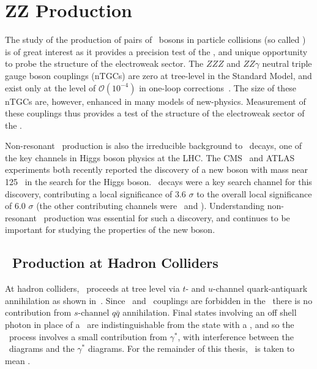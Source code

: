 \graphicspath{{Chapters/TheoryZZProduction/Figures/}}
\chapter{ZZ Production}
\label{chap:TheoryZZProduction}


The study of the production of pairs of \Z\ bosons in particle collisions (so
called ) is of great interest as it provides a
precision test of the \sm, and unique opportunity to probe the structure of the
electroweak sector.  The $ZZZ$ and $ZZ\gamma$ neutral triple gauge boson
couplings (nTGCs) are zero at tree-level in the Standard Model, and exist only
at the level of  $\mathcal{O}(10^{-4})$ in one-loop
corrections~\cite{Gounaris:2000dn}. The size of these nTGCs are, however,
enhanced in many models of new-physics. Measurement of these couplings thus
provides a test of the structure of the electroweak sector of the \sm.

Non-resonant \ZZ\ production is also the irreducible background to \HZZ\ decays,
one of the key channels in Higgs boson physics at the LHC. The
CMS~\cite{CMS_Higgs:2012gu} and ATLAS~\cite{ATLAS_Higgs:2012gk} experiments both
recently reported the discovery of a new boson with mass near 125 \gev\ in the
search for the Higgs boson. \HZZ\ decays were a key search channel for this
discovery, contributing a local significance of 3.6 $\sigma$ to the overall
local significance of 6.0 $\sigma$ (the other contributing channels were \Hgg\
and \HWW). Understanding non-resonant \ZZ\ production was essential for such a
discovery, and continues to be important for studying the properties of the new
boson.

\section{\ZZ\ Production at Hadron Colliders}

At hadron colliders, \qqZZ\ proceeds at tree level via $t$- and $u$-channel
quark-antiquark annihilation as shown in~\fig{theoryzz-fd-qqZZ}. Since \ZZZ\ and
\ZZg\ couplings are forbidden in the \sm\ there is no contribution from
$s$-channel $q\bar{q}$ annihilation. Final states involving an off shell photon
in place of a \Z\ are indistinguishable from the state with a \Z, and so the
\qqZZ\ process involves a small contribution from $\gamma^{*}$, with
interference between the \Z\ diagrams and the $\gamma^{*}$ diagrams. For the
remainder of this thesis, \Z\ is taken to mean \Zorgv.

